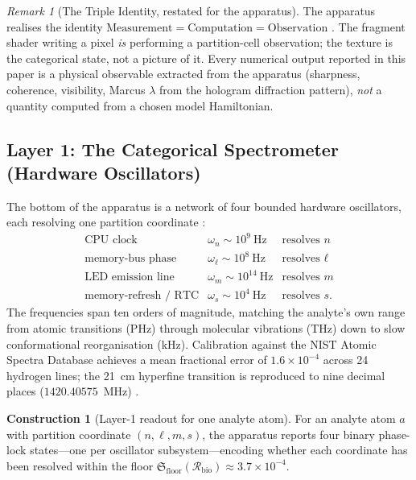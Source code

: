 \documentclass[11pt,twocolumn,a4paper]{article}
\theoremstyle{definition}
\newtheorem{construction}[theorem]{Construction}
\theoremstyle{remark}
\newtheorem{remark}[theorem]{Remark}
\newcommand{\Recv}{\mathcal{R}}
\newcommand{\Floor}{\mathfrak{S}_{\mathrm{floor}}}
\begin{document}
\begin{remark}[The Triple Identity, restated for the apparatus]
\label{rem:triple_identity}
The apparatus realises the identity
$\mathrm{Measurement} = \mathrm{Computation} = \mathrm{Observation}$
\citep{sachikonye2025_atomicspec}. The fragment shader writing a pixel
\emph{is} performing a partition-cell observation; the texture is the
categorical state, not a picture of it. Every numerical output reported
in this paper is a physical observable extracted from the apparatus
(sharpness, coherence, visibility, Marcus $\lambda$ from the hologram
diffraction pattern), \emph{not} a quantity computed from a chosen model
Hamiltonian.
\end{remark}

\subsection{Layer 1: The Categorical Spectrometer (Hardware Oscillators)}
\label{sec:layer1}

The bottom of the apparatus is a network of four bounded hardware
oscillators, each resolving one partition coordinate
\citep{sachikonye2025_hyperfine}:
\begin{equation}
\label{eq:oscillator_table}
\begin{array}{lll}
\text{CPU clock}            & \omega_n \sim 10^{9}~\text{Hz}  & \text{resolves } n \\
\text{memory-bus phase}     & \omega_\ell \sim 10^{8}~\text{Hz} & \text{resolves } \ell \\
\text{LED emission line}    & \omega_m \sim 10^{14}~\text{Hz} & \text{resolves } m \\
\text{memory-refresh / RTC} & \omega_s \sim 10^{4}~\text{Hz}  & \text{resolves } s.
\end{array}
\end{equation}
The frequencies span ten orders of magnitude, matching the analyte's own
range from atomic transitions (PHz) through molecular vibrations (THz)
down to slow conformational reorganisation (kHz). Calibration against
the NIST Atomic Spectra Database achieves a mean fractional error of
$1.6 \times 10^{-4}$ across 24 hydrogen lines; the 21~cm hyperfine
transition is reproduced to nine decimal places ($1420.40575$~MHz)
\citep{sachikonye2025_hyperfine}.

\begin{construction}[Layer-1 readout for one analyte atom]
\label{cons:layer1_readout}
For an analyte atom $a$ with partition coordinate $(n, \ell, m, s)$, the
apparatus reports four binary phase-lock states---one per oscillator
subsystem---encoding whether each coordinate has been resolved within
the floor $\Floor(\Recv_{\mathrm{bio}}) \approx 3.7 \times 10^{-4}$.
\end{construction}
\end{document}
